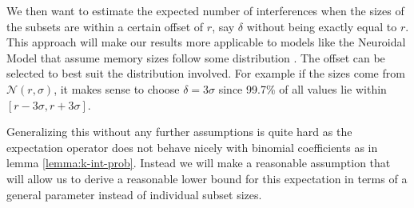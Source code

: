 We then want to estimate the expected number of interferences when the sizes of the subsets are within a certain offset of $r$, say $\delta$ without being exactly equal to $r$. This approach will make our results more applicable to models like the Neuroidal Model that assume memory sizes follow some distribution \cite{valiant2005memorization}. The offset can be selected to best suit the distribution involved. For example if the sizes come from $\mathcal{N}(r,\sigma)$, it makes sense to choose $\delta  = 3\sigma$ since 99.7\% of all values lie within $[r-3\sigma,r+3\sigma]$. 

Generalizing this without any further assumptions is quite hard as the expectation operator does not behave nicely with binomial coefficients as in lemma \ref{lemma:k-int-prob}. Instead we will make a reasonable assumption that will allow us to derive a reasonable lower bound for this expectation in terms of a general parameter instead of individual subset sizes. 

